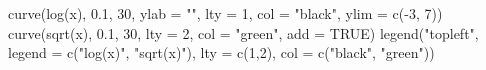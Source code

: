 \begin{Schunk}
\begin{Sinput}
 curve(log(x), 0.1, 30, ylab = "", lty = 1, col = "black", ylim = c(-3, 7))
 curve(sqrt(x), 0.1, 30, lty = 2, col = "green", add = TRUE)
 legend("topleft", legend = c("log(x)", "sqrt(x)"), lty = c(1,2), col = c("black", "green"))
\end{Sinput}
\end{Schunk}
